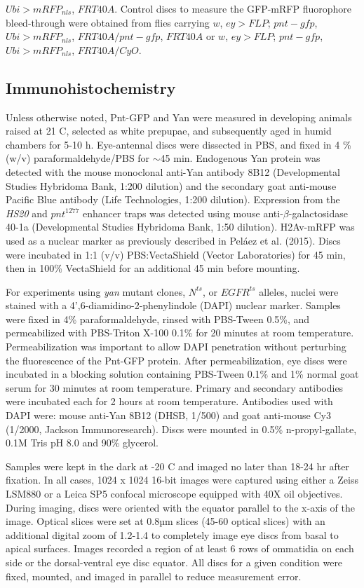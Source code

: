 $Ubi>mRFP_{nls}$, $FRT40A$. Control discs to measure the GFP-mRFP fluorophore bleed-through were obtained from flies carrying $w$, $ey>FLP$; $pnt-gfp$, $Ubi>mRFP_{nls}$, $FRT40A/pnt-gfp$, $FRT40A$ or $w$, $ey>FLP$; $pnt-gfp$, $Ubi>mRFP_{nls}$, $FRT40A/CyO$.

\subsection{Immunohistochemistry}
\label{appendix:methods:ratio:immunohistochemistry}

Unless otherwise noted, Pnt-GFP and Yan were measured in developing animals raised at 21 \textdegree{} C, selected as white prepupae, and subsequently aged in humid chambers for 5-10 h. Eye-antennal discs were dissected in PBS, and fixed in 4 \% (w/v) paraformaldehyde/PBS for $\sim$45 min. Endogenous Yan protein was detected with the mouse monoclonal anti-Yan antibody 8B12 (Developmental Studies Hybridoma Bank, 1:200 dilution) and the secondary goat anti-mouse Pacific Blue antibody (Life Technologies, 1:200 dilution). Expression from the \textit{HS20} and $pnt^{1277}$ enhancer traps was detected using mouse anti-$\beta$-galactosidase 40-1a (Developmental Studies Hybridoma Bank, 1:50 dilution). H2Av-mRFP was used as a nuclear marker as previously described in Pel\'{a}ez et al. (2015). Discs were incubated in 1:1 (v/v) PBS:VectaShield (Vector Laboratories) for 45 min, then in 100\% VectaShield for an additional 45 min before mounting.

For experiments using \textit{yan} mutant clones, $N^{ts}$, or $EGFR^{ts}$ alleles, nuclei were stained with a 4',6-diamidino-2-phenylindole (DAPI) nuclear marker. Samples were fixed in 4\% paraformaldehyde, rinsed with PBS-Tween 0.5\%, and permeabilized with PBS-Triton X-100 0.1\% for 20 minutes at room temperature. Permeabilization was important to allow DAPI penetration without perturbing the fluorescence of the Pnt-GFP protein. After permeabilization, eye discs were incubated in a blocking solution containing PBS-Tween 0.1\% and 1\% normal goat serum for 30 minutes at room temperature. Primary and secondary antibodies were incubated each for 2 hours at room temperature. Antibodies used with DAPI were: mouse anti-Yan 8B12 (DHSB, 1/500) and goat anti-mouse Cy3 (1/2000, Jackson Immunoresearch). Discs were mounted in 0.5\% n-propyl-gallate, 0.1M Tris pH 8.0 and 90\% glycerol.

Samples were kept in the dark at -20 \textdegree{}C and imaged no later than 18-24 hr after fixation. In all cases, 1024 x 1024 16-bit images were captured using either a Zeiss LSM880 or a Leica SP5 confocal microscope equipped with 40X oil objectives. During imaging, discs were oriented with the equator parallel to the x-axis of the image. Optical slices were set at 0.8µm slices (45-60 optical slices) with an additional digital zoom of 1.2-1.4 to completely image eye discs from basal to apical surfaces. Images recorded a region of at least 6 rows of ommatidia on each side or the dorsal-ventral eye disc equator. All discs for a given condition were fixed, mounted, and imaged in parallel to reduce measurement error.

